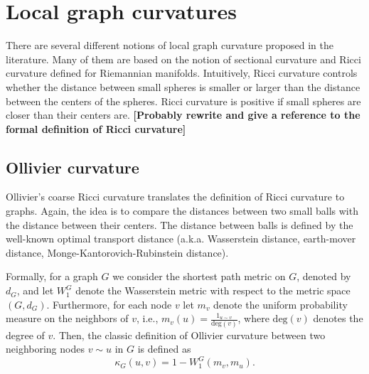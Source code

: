 \documentclass{article} %
\begin{document}
\section{Local graph curvatures}

There are several different notions of local graph curvature proposed in the literature. Many of them are based on the notion of sectional curvature and Ricci curvature defined for Riemannian manifolds. Intuitively, Ricci curvature controls whether the distance between small spheres is smaller or larger than the distance between the centers of the spheres. 
Ricci curvature is positive if
small spheres are closer than their centers are.
\textbf{[Probably rewrite and give a reference to the formal definition of Ricci curvature]}

\subsection{Ollivier curvature}

Ollivier's coarse Ricci curvature translates the definition of Ricci curvature to graphs. 
Again, the idea is to compare the distances between two small balls with the
distance between their centers. 
The distance between balls is defined by the well-known optimal transport
distance (a.k.a. Wasserstein distance, earth-mover distance,
Monge-Kantorovich-Rubinstein distance).

Formally, for a graph $G$ we consider the shortest path metric on $G$, denoted by $d_G$, and let $W_1^G$ denote the Wasserstein metric with respect to the metric space $(G,d_G)$. Furthermore, for each node $v$ let $m_v$ denote the uniform probability measure on the neighbors of $v$, i.e., $m_v(u) = \frac{1_{u \sim v}}{\mathrm{deg}(v)}$, where $\mathrm{deg}(v)$ denotes the degree of $v$. Then, the classic definition of Ollivier curvature between two neighboring nodes $v \sim u$ in $G$ is defined as
\begin{equation}\label{eq:def_classic_ollivier_graphs}
	\kappa_G(u,v) = 1 - W_1^G(m_v, m_u).
\end{equation}
\end{document}

